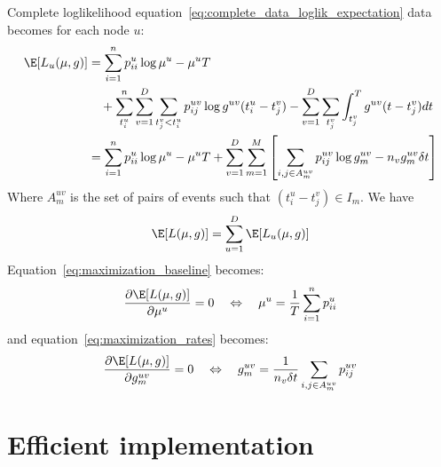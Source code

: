 \documentclass[a4paper]{article}
\begin{document}
Complete loglikelihood equation~\ref{eq:complete_data_loglik_expectation} data becomes for each node $u$:
\begin{align*}
\E[ L_u(\mu, g)] &= \sum_{i=1}^n p_{ii}^u \log \mu^u - \mu^u T  \\
	             &\quad +  \sum_{t_i^u}^n \sum_{v=1}^D \sum_{t_j^v < t_i^u} p_{ij}^{uv} \log g^{uv}(t_i^u - t_j^v)
	                                               - \sum_{v=1}^D \sum_{t_j^v} \int_{t_j^v}^T g^{uv}(t - t_j^v) dt \\
                 &= \sum_{i=1}^n p_{ii}^u \log \mu^u - \mu^u T
                    + \sum_{v=1}^D \sum_{m=1}^M \left[ \sum_{i, j \in A_m^{uv}} p^{uv}_{ij} \log g_m^{uv}
                     - n_v g_m^{uv} \delta t \right]
\end{align*}
Where $A_m^{uv}$ is the set of pairs of events such that $(t_i^u - t_j^v) \in I_m$.
We have
\[\E[ L(\mu, g)] = \sum_{u=1}^D \E[ L_u(\mu, g)] \]
Equation~\ref{eq:maximization_baseline} becomes:
\begin{equation}
	\label{eq:multi_maximization_baseline}
	\frac{\partial \E[ L(\mu, g)]}{\partial \mu^u} = 0
	\quad \Leftrightarrow \quad
	\mu^u = \frac{1}{T} \sum_{i=1}^{n} p_{ii}^u
\end{equation}
and equation~\ref{eq:maximization_rates} becomes:
\begin{equation}
	\label{eq:multi_maximization_rates}
	\frac{\partial \E[ L(\mu, g)]}{\partial g_m^{uv}} = 0
	\quad \Leftrightarrow \quad
	g_m^{uv} = \frac{1}{n_v \delta t } \sum_{i, j \in A_m^{uv}} p_{ij}^{uv}
\end{equation}



\newpage

\section{Efficient implementation} %
\label{sec:efficient_implementation}
\end{document}

